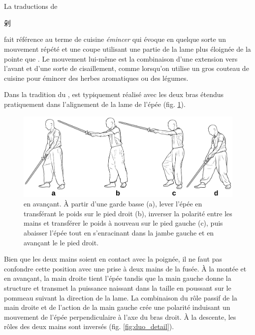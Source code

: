 \section{\Duo}
La traductions de \Duo{} \begin{CJK*}{UTF8}{bsmi}剁\end{CJK*} fait référence au terme de cuisine \textit{émincer} qui évoque en quelque sorte un mouvement répété et une coupe utilisant une partie de la lame plus éloignée de la pointe que \Pi{}. Le mouvement lui-même est la combinaison d'une extension vers l'avant et d'une sorte de cisaillement, comme lorsqu'on utilise un gros couteau de cuisine pour émincer des herbes aromatiques ou des légumes.

Dans la tradition du \Yangjia{} \Michuan{}, \Duo{} est typiquement réalisé avec les deux bras étendus pratiquement dans l'alignement de la lame de l'épée (fig. \ref{fig:duo_full}). 


\begin{figure}[ht]
	\centering
	
	\includegraphics[width=1.00\textwidth]{../../Images/JibenJianfa/Duo/Duo.pdf}
	\caption[\Duo{} en avançant]{\Duo{} en avançant. À partir d'une garde basse (a), lever l'épée en transférant le poids sur le pied droit (b), inverser la polarité entre les mains et transférer le poids à nouveau sur le pied gauche (c), puis abaisser l'épée tout en s'enracinant dans la jambe gauche et en avançant le le pied droit.}
	\label{fig:duo_full}
\end{figure} 

Bien que les deux mains soient en contact avec la poignée, il ne faut pas confondre cette position avec une prise à deux mains de la fusée. À la montée et en avançant, la main droite tient l'épée tandis que la main gauche donne la structure et transmet la puissance naissant dans la taille en poussant sur le pommeau suivant la direction de la lame. La combinaison du rôle passif de la main droite et de l'action de la main gauche crée une polarité induisant un mouvement de l'épée perpendiculaire à l'axe du bras droit. À la descente, les rôles des deux mains sont inversés (fig. \ref{fig:duo_detail}). 

